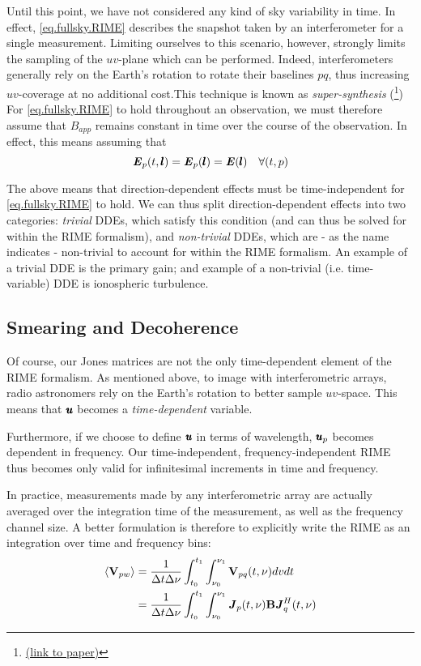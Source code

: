 \pg
Until this point, we have not considered any kind of sky variability in time. In effect, \cref{eq.fullsky.RIME} describes the snapshot taken by an interferometer for a single measurement. Limiting ourselves to this scenario, however, strongly limits the sampling of the $uv$-plane which can be performed. Indeed, interferometers generally rely on the Earth's rotation to rotate their baselines $pq$, thus increasing $uv$-coverage at no additional cost.This technique is known as \emph{super-synthesis} (\cite{supersynthesis}\footnote{\href{http://www.jpier.org/PIERB/pierb22/05.10032105.pdf}{(link to paper)}}) For \cref{eq.fullsky.RIME} to hold throughout an observation, we must therefore assume that $B_{app}$ remains constant in time over the course of the observation. In effect, this means assuming that
\begin{equation}\label{eq.selfcal.requirement}
\textbf{\emph{E}}_p(t,\pmb{l}) = \textbf{\emph{E}}_p(\pmb{l}) = \textbf{\emph{E}}(\pmb{l}) \quad \forall (t,p)
\end{equation}

\pg
The above means that direction-dependent effects must be time-independent for \cref{eq.fullsky.RIME} to hold. We can thus split direction-dependent effects into two categories: \emph{trivial} DDEs, which satisfy this condition (and can thus be solved for within the RIME formalism), and \emph{non-trivial} DDEs, which are - as the name indicates - non-trivial to account for within the RIME formalism. An example of a trivial DDE is the primary gain; and example of a non-trivial (i.e. time-variable) DDE is ionospheric turbulence.

\subsection{Smearing and Decoherence}
\label{section.RIME.TimeDep.Decoherence}

\pg
Of course, our Jones matrices are not the only time-dependent element of the RIME formalism. As mentioned above, to image with interferometric arrays, radio astronomers rely on the Earth's rotation to better sample $uv$-space. This means that $\pmb{u}$ becomes a \emph{time-dependent} variable.

\pg
Furthermore, if we choose to define $\pmb{u}$ in terms of wavelength, $\pmb{u}_p$ becomes dependent in frequency. Our time-independent, frequency-independent RIME thus becomes only valid for infinitesimal increments in time and frequency.

\pg
In practice, measurements made by any interferometric array are actually averaged over the integration time of the measurement, as well as the frequency channel size. A better formulation is therefore to explicitly write the RIME as an integration over time and frequency bins:
\begin{align}
\langle \textbf{V}_{pw} \rangle &= \frac{1}{\Delta t \Delta \nu} \int_{t_0}^{t_1} \int_{\nu_0}^{\nu_1} \textbf{V}_{pq}(t,\nu) dv dt\\
                          &= \frac{1}{\Delta t \Delta \nu} \int_{t_0}^{t_1} \int_{\nu_0}^{\nu_1} \textbf{\emph{J}}_p(t,\nu) \textbf{B} \textbf{\emph{J}}_q^H(t,\nu)
\end{align}

